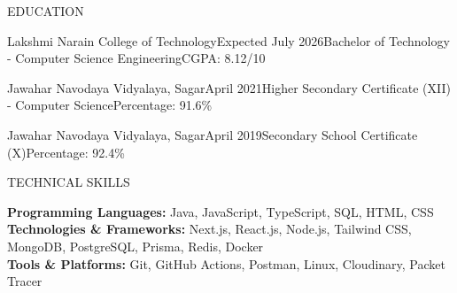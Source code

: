 \documentclass{resume}
\begin{document}
\begin{rSection}{EDUCATION}

\begin{rEducation}{Lakshmi Narain College of Technology}{Expected July 2026}{Bachelor of Technology - Computer Science Engineering}{CGPA: 8.12/10}
\end{rEducation}

\begin{rEducation}{Jawahar Navodaya Vidyalaya, Sagar}{April 2021}{Higher Secondary Certificate (XII) - Computer Science}{Percentage: 91.6\%}
\end{rEducation}

\begin{rEducation}{Jawahar Navodaya Vidyalaya, Sagar}{April 2019}{Secondary School Certificate (X)}{Percentage: 92.4\%}
\end{rEducation}

\end{rSection}

\begin{rSection}{TECHNICAL SKILLS}

\textbf{Programming Languages:} Java, JavaScript, TypeScript, SQL, HTML, CSS \\[2pt]
\textbf{Technologies \& Frameworks:} Next.js, React.js, Node.js, Tailwind CSS, MongoDB, PostgreSQL, Prisma, Redis, Docker \\[2pt]
\textbf{Tools \& Platforms:} Git, GitHub Actions, Postman, Linux, Cloudinary, Packet Tracer

\end{rSection}
\end{document}
